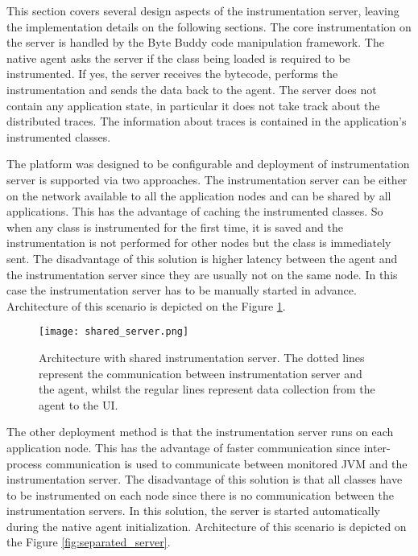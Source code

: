 This section covers several design aspects of the instrumentation server, leaving the implementation details on the following sections. The core instrumentation on the server is handled by the Byte Buddy code manipulation framework. The native agent asks the server if the class being loaded is required to be instrumented. If yes, the server receives the bytecode, performs the instrumentation and sends the data back to the agent. The server does not contain any application state, in particular it does not take track about the distributed traces. The information about traces is contained in the application's instrumented classes.

The platform was designed to be configurable and deployment of instrumentation server is supported via two approaches. The instrumentation server can be either on the network available to all the application nodes and can be shared by all applications. This has the advantage of caching the instrumented classes. So when any class is instrumented for the first time, it is saved and the instrumentation is not performed for other nodes but the class is immediately sent. The disadvantage of this solution is higher latency between the agent and the instrumentation server since they are usually not on the same node. In this case the instrumentation server has to be manually started in advance. Architecture of this scenario is depicted on the Figure \ref{fig:shared_server}.
 
 \begin{figure}
 	\centering
 	\texttt{[image: shared\_server.png]}
 	\caption{Architecture with shared instrumentation server. The dotted lines represent the communication between instrumentation server and the agent, whilst the regular lines represent data collection from the agent to the UI.}
 	\label{fig:shared_server}
 \end{figure}
 
 The other deployment method is that the instrumentation server runs on each application node. This has the advantage of faster communication since  inter-process communication is used to communicate between monitored JVM and the instrumentation server. The disadvantage of this solution is that all classes have to be instrumented on each node since there is no communication between the instrumentation servers. In this solution, the server is started automatically during the native agent initialization. Architecture of this scenario is depicted on the Figure \ref{fig:separated_server}.
 
